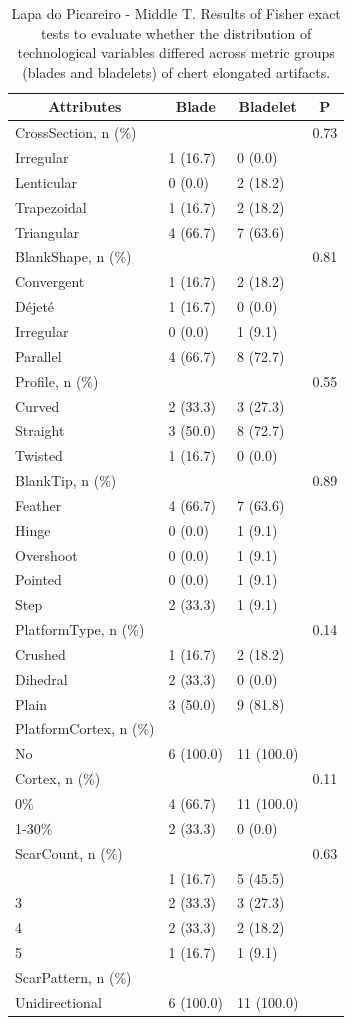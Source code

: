 \documentclass[12pt,twoside]{reedthesis}
\begin{document}
\begin{longtable}[t]{llll}
\caption{\label{tab:fisherelongLP2}Lapa do Picareiro - Middle T. Results of Fisher exact tests to evaluate whether the distribution of technological variables differed across metric groups (blades and bladelets) of chert elongated artifacts.}\\
\toprule
\multicolumn{1}{c}{\textbf{Attributes}} & \multicolumn{1}{c}{\textbf{Blade}} & \multicolumn{1}{c}{\textbf{Bladelet}} & \multicolumn{1}{c}{\textbf{P}}\\
\midrule
CrossSection, n (\%) &  &  & 0.73\\
Irregular & 1 (16.7) & 0 (0.0) & \\
Lenticular & 0 (0.0) & 2 (18.2) & \\
Trapezoidal & 1 (16.7) & 2 (18.2) & \\
Triangular & 4 (66.7) & 7 (63.6) & \\
\addlinespace
BlankShape, n (\%) &  &  & 0.81\\
Convergent & 1 (16.7) & 2 (18.2) & \\
Déjeté & 1 (16.7) & 0 (0.0) & \\
Irregular & 0 (0.0) & 1 (9.1) & \\
Parallel & 4 (66.7) & 8 (72.7) & \\
\addlinespace
Profile, n (\%) &  &  & 0.55\\
Curved & 2 (33.3) & 3 (27.3) & \\
Straight & 3 (50.0) & 8 (72.7) & \\
Twisted & 1 (16.7) & 0 (0.0) & \\
BlankTip, n (\%) &  &  & 0.89\\
\addlinespace
Feather & 4 (66.7) & 7 (63.6) & \\
Hinge & 0 (0.0) & 1 (9.1) & \\
Overshoot & 0 (0.0) & 1 (9.1) & \\
Pointed & 0 (0.0) & 1 (9.1) & \\
Step & 2 (33.3) & 1 (9.1) & \\
\addlinespace
PlatformType, n (\%) &  &  & 0.14\\
Crushed & 1 (16.7) & 2 (18.2) & \\
Dihedral & 2 (33.3) & 0 (0.0) & \\
Plain & 3 (50.0) & 9 (81.8) & \\
PlatformCortex, n (\%) &  &  & \\
\addlinespace
No & 6 (100.0) & 11 (100.0) & \\
Cortex, n (\%) &  &  & 0.11\\
0\% & 4 (66.7) & 11 (100.0) & \\
1-30\% & 2 (33.3) & 0 (0.0) & \\
ScarCount, n (\%) &  &  & 0.63\\
\addlinespace
2 & 1 (16.7) & 5 (45.5) & \\
3 & 2 (33.3) & 3 (27.3) & \\
4 & 2 (33.3) & 2 (18.2) & \\
5 & 1 (16.7) & 1 (9.1) & \\
ScarPattern, n (\%) &  &  & \\
\addlinespace
Unidirectional & 6 (100.0) & 11 (100.0) & \\
\bottomrule
\end{longtable}
\end{document}
